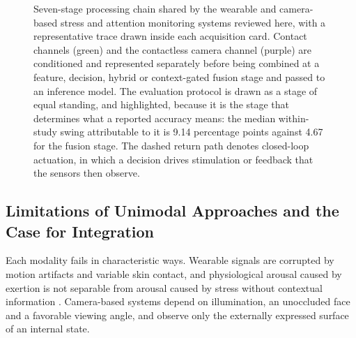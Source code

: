 \documentclass[11pt,a4paper]{article}
\begin{document}
\begin{figure}[!htbp]
{
}
\caption{Seven-stage processing chain shared by the wearable and camera-based stress and
attention monitoring systems reviewed here, with a representative trace drawn inside each
acquisition card. Contact channels (green) and the contactless camera channel (purple) are
conditioned and represented separately before being combined at a feature, decision, hybrid
or context-gated fusion stage and passed to an inference model. The evaluation protocol is
drawn as a stage of equal standing, and highlighted, because it is the stage that determines
what a reported accuracy means: the median within-study swing attributable to it is 9.14
percentage points against 4.67 for the fusion stage. The dashed return path denotes
closed-loop actuation, in which a decision drives stimulation or feedback that the sensors
then observe.}
\label{fig:block}
\end{figure}

\subsection{Limitations of Unimodal Approaches and the Case for Integration}
Each modality fails in characteristic ways. Wearable signals are corrupted by motion
artifacts and variable skin contact, and physiological arousal caused by exertion is not
separable from arousal caused by stress without contextual information \cite{r19,r79}.
Camera-based systems depend on illumination, an unoccluded face and a favorable viewing
angle, and observe only the externally expressed surface of an internal state.
\end{document}
